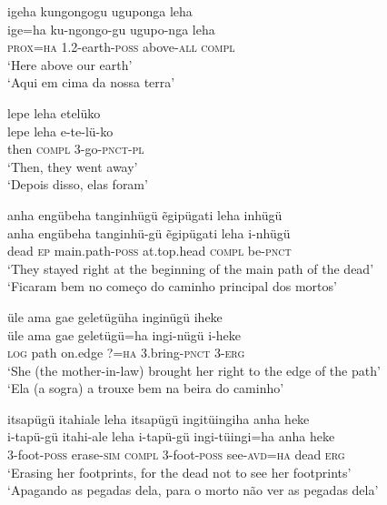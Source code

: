 \documentclass[output=paper,
modfonts,nonflat
]{langsci/langscibook}
\begin{document}
\ea igeha kungongogu uguponga leha \\[.3em]
\gll ige=ha ku-ngongo-gu ugupo-nga leha \\
\textsc{prox=ha} 1.2{\footnotemark}-earth-\textsc{poss} above-\textsc{all} \textsc{compl} \\
\glt ‘Here above our earth’ \\
‘Aqui em cima da nossa terra’ \\
\z

\ea lepe leha etelüko \\[.3em]
\gll lepe	leha	e-te-lü-ko \\
then	\textsc{compl} 3-go-\textsc{pnct-pl} \\
\glt ‘Then, they went away’ \\
‘Depois disso, elas foram’ \\
\z

\ea anha engübeha tanginhügü ẽgipügati leha inhügü \\[.3em]
\gll anha	engübeha	tanginhü-gü	ẽgipügati	leha	i-nhügü \\
dead 	\textsc{ep} 		main.path-\textsc{poss} 	at.top.head 	\textsc{compl}	be-\textsc{pnct} \\
\glt ‘They stayed right at the beginning of the main path of the dead’ \\
‘Ficaram bem no começo do caminho principal dos mortos’ \\
\z

\newpage 
\ea üle ama gae geletügüha inginügü iheke \\[.3em]
\gll üle	ama	gae	geletügü=ha	ingi-nügü	i-heke \\
\textsc{log} 	path 	on.edge	?=\textsc{ha} 		3.bring-\textsc{pnct}	3-\textsc{erg} \\
\glt ‘She (the mother-in-law) brought her right to the edge of the path’ \\
‘Ela (a sogra) a trouxe bem na beira do caminho’ \\
\z


\ea itsapügü itahiale leha itsapügü ingitüingiha anha heke\\[.3em]
\gll i-tapü-gü	itahi-ale	leha	i-tapü-gü	ingi-tüingi=ha	anha	heke\\
3-foot-\textsc{poss}	erase-\textsc{sim}	\textsc{compl}	3-foot-\textsc{poss}	see-\textsc{avd=ha} 	dead	\textsc{erg}\\
\glt ‘Erasing her footprints, for the dead not to see her footprints’ \\
‘Apagando as pegadas dela, para o morto não ver as pegadas dela’ \\
\z
\end{document}
